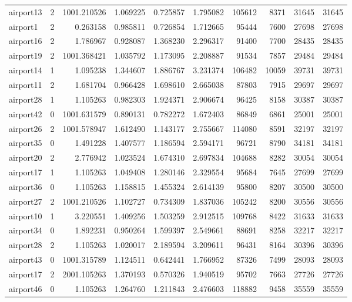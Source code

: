 \begin{longtable}{|l|r|r|r|r|r|r|r|r|r|}
airport13 & 2 & 1001.210526 & 1.069225 & 0.725857 & 1.795082 & 105612 & 8371 & 31645 & 31645 \\
airport1 & 2 & 0.263158 & 0.985811 & 0.726854 & 1.712665 & 95444 & 7600 & 27698 & 27698 \\
airport16 & 2 & 1.786967 & 0.928087 & 1.368230 & 2.296317 & 91400 & 7700 & 28435 & 28435 \\
airport19 & 2 & 1001.368421 & 1.035792 & 1.173095 & 2.208887 & 91534 & 7857 & 29484 & 29484 \\
airport14 & 1 & 1.095238 & 1.344607 & 1.886767 & 3.231374 & 106482 & 10059 & 39731 & 39731 \\
airport11 & 2 & 1.681704 & 0.966428 & 1.698610 & 2.665038 & 87803 & 7915 & 29697 & 29697 \\
airport28 & 1 & 1.105263 & 0.982303 & 1.924371 & 2.906674 & 96425 & 8158 & 30387 & 30387 \\
airport42 & 0 & 1001.631579 & 0.890131 & 0.782272 & 1.672403 & 86849 & 6861 & 25001 & 25001 \\
airport26 & 2 & 1001.578947 & 1.612490 & 1.143177 & 2.755667 & 114080 & 8591 & 32197 & 32197 \\
airport35 & 0 & 1.491228 & 1.407577 & 1.186594 & 2.594171 & 96721 & 8790 & 34181 & 34181 \\
airport20 & 2 & 2.776942 & 1.023524 & 1.674310 & 2.697834 & 104688 & 8282 & 30054 & 30054 \\
airport17 & 1 & 1.105263 & 1.049408 & 1.280146 & 2.329554 & 95684 & 7645 & 27699 & 27699 \\
airport36 & 0 & 1.105263 & 1.158815 & 1.455324 & 2.614139 & 95800 & 8207 & 30500 & 30500 \\
airport27 & 2 & 1001.210526 & 1.102727 & 0.734309 & 1.837036 & 105242 & 8200 & 30556 & 30556 \\
airport10 & 1 & 3.220551 & 1.409256 & 1.503259 & 2.912515 & 109768 & 8422 & 31633 & 31633 \\
airport34 & 0 & 1.892231 & 0.950264 & 1.599397 & 2.549661 & 88691 & 8258 & 32217 & 32217 \\
airport28 & 2 & 1.105263 & 1.020017 & 2.189594 & 3.209611 & 96431 & 8164 & 30396 & 30396 \\
airport43 & 0 & 1001.315789 & 1.124511 & 0.642441 & 1.766952 & 87326 & 7499 & 28093 & 28093 \\
airport17 & 2 & 2001.105263 & 1.370193 & 0.570326 & 1.940519 & 95702 & 7663 & 27726 & 27726 \\
airport46 & 0 & 1.105263 & 1.264760 & 1.211843 & 2.476603 & 118882 & 9458 & 35559 & 35559 \\

\end{longtable}
